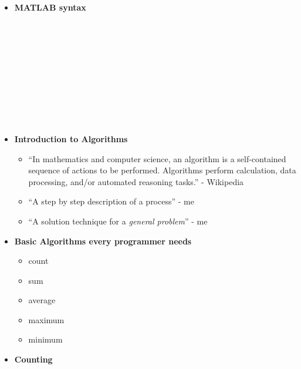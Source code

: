 \documentclass[11pt]{article}
\begin{document}
\begin{itemize}
				\item \textbf{\LARGE MATLAB \color{mypurple} syntax \color{black}}\\
\begin{framed}				
						  \\\\
						  \\\\
						 \hspace*{10mm} \\\\
						 \hspace*{10mm} \\\\
						  \\		
\end{framed}
			
				\newpage
				
\item \textbf{ \LARGE Introduction to \color{mypurple} Algorithms \color{black}}\\
{\LARGE
\begin{itemize}
	\item ``In mathematics and computer science, an algorithm is a self-contained sequence of actions to be performed. Algorithms perform calculation, data processing, and/or automated reasoning tasks.'' - Wikipedia\vspace{10mm}
	\item ``A step by step description of a process'' - me\vspace{10mm}
	\item ``A solution technique for a {\it general problem}'' - me\vspace{10mm}
	\end{itemize}
	}
	\item \textbf{ \LARGE Basic \color{mypurple} Algorithms \color{black} every programmer needs}\\
	{\LARGE
	\begin{itemize}
	\item count \vspace{10mm}
	\item sum  \vspace{10mm}
	\item average  \vspace{10mm}
	\item maximum  \vspace{10mm}
	\item minimum  \vspace{10mm}
	\end{itemize}
	}
				\newpage
				\item \textbf{ \LARGE \color{mypurple} Counting \color{black}}\\
	

\end{itemize}
\end{document}
